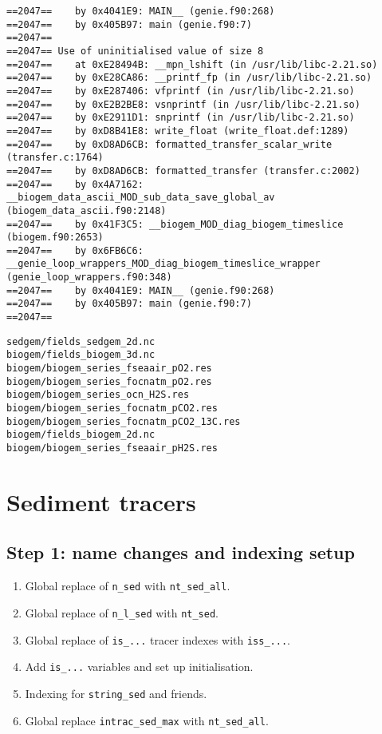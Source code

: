 \documentclass[a4paper,10pt,article]{memoir}
\begin{document}
\begin{verbatim}
==2047==    by 0x4041E9: MAIN__ (genie.f90:268)
==2047==    by 0x405B97: main (genie.f90:7)
==2047==
==2047== Use of uninitialised value of size 8
==2047==    at 0xE28494B: __mpn_lshift (in /usr/lib/libc-2.21.so)
==2047==    by 0xE28CA86: __printf_fp (in /usr/lib/libc-2.21.so)
==2047==    by 0xE287406: vfprintf (in /usr/lib/libc-2.21.so)
==2047==    by 0xE2B2BE8: vsnprintf (in /usr/lib/libc-2.21.so)
==2047==    by 0xE2911D1: snprintf (in /usr/lib/libc-2.21.so)
==2047==    by 0xD8B41E8: write_float (write_float.def:1289)
==2047==    by 0xD8AD6CB: formatted_transfer_scalar_write (transfer.c:1764)
==2047==    by 0xD8AD6CB: formatted_transfer (transfer.c:2002)
==2047==    by 0x4A7162: __biogem_data_ascii_MOD_sub_data_save_global_av (biogem_data_ascii.f90:2148)
==2047==    by 0x41F3C5: __biogem_MOD_diag_biogem_timeslice (biogem.f90:2653)
==2047==    by 0x6FB6C6: __genie_loop_wrappers_MOD_diag_biogem_timeslice_wrapper (genie_loop_wrappers.f90:348)
==2047==    by 0x4041E9: MAIN__ (genie.f90:268)
==2047==    by 0x405B97: main (genie.f90:7)
==2047==
\end{verbatim}


\begin{verbatim}
sedgem/fields_sedgem_2d.nc
biogem/fields_biogem_3d.nc
biogem/biogem_series_fseaair_pO2.res
biogem/biogem_series_focnatm_pO2.res
biogem/biogem_series_ocn_H2S.res
biogem/biogem_series_focnatm_pCO2.res
biogem/biogem_series_focnatm_pCO2_13C.res
biogem/fields_biogem_2d.nc
biogem/biogem_series_fseaair_pH2S.res
\end{verbatim}

\section{Sediment tracers}

\subsection{Step 1: name changes and indexing setup}

\begin{enumerate}
  \item{Global replace of \texttt{n\_sed} with \texttt{nt\_sed\_all}.}
  \item{Global replace of \texttt{n\_l\_sed} with \texttt{nt\_sed}.}
  \item{Global replace of \texttt{is\_...} tracer indexes with
    \texttt{iss\_...}.}
  \item{Add \texttt{is\_...} variables and set up initialisation.}
  \item{Indexing for \texttt{string\_sed} and friends.}
  \item{Global replace \texttt{intrac\_sed\_max} with \texttt{nt\_sed\_all}.}
\end{enumerate}
\end{document}
